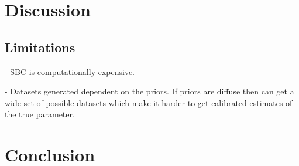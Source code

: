 \documentclass[12pt, a4paper]{article}
\begin{document}
\section{Discussion}

\subsection{Limitations}
- SBC is computationally expensive. 

- Datasets generated dependent on the priors. If priors are diffuse then can get a wide set of possible datasets which make it harder to get calibrated estimates of the true parameter.

\section{Conclusion}

\newpage


\end{document}
